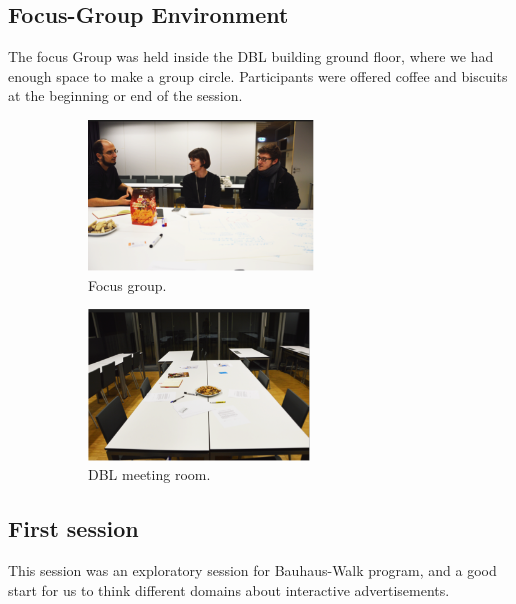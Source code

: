 \subsection{Focus-Group Environment}
The focus Group was held inside the DBL building ground floor, where we had enough space to make a group circle. Participants were offered coffee and biscuits at the beginning or end of the session.



\begin{figure}[H]
    \centering
    \begin{subfigure}[H]{0.45\textwidth}
        \centering
        \includegraphics[width=\textwidth,height=4cm]{Figures/4/focus_group}
        \caption{Focus group.}
        \label{fig:focus_group}
    \end{subfigure}
    \hfill
    \begin{subfigure}[H]{0.45\textwidth}
        \centering
        \includegraphics[width=\textwidth,height=4cm]{Figures/4/meeting_room}
        \caption{DBL meeting room.}
        \label{fig:meeting_room}
    \end{subfigure}
    \caption{}
    \label{fig:Focus_group_room}
\end{figure}


\subsection{First session}
This session was an exploratory session for Bauhaus-Walk program, and a good start for us to think different domains about interactive advertisements.

